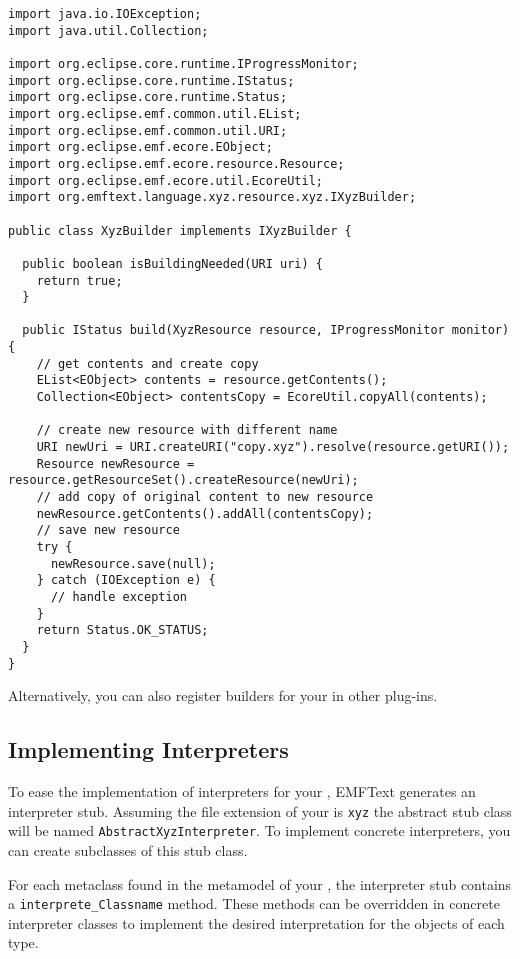 \begin{lstlisting}
import java.io.IOException;
import java.util.Collection;

import org.eclipse.core.runtime.IProgressMonitor;
import org.eclipse.core.runtime.IStatus;
import org.eclipse.core.runtime.Status;
import org.eclipse.emf.common.util.EList;
import org.eclipse.emf.common.util.URI;
import org.eclipse.emf.ecore.EObject;
import org.eclipse.emf.ecore.resource.Resource;
import org.eclipse.emf.ecore.util.EcoreUtil;
import org.emftext.language.xyz.resource.xyz.IXyzBuilder;

public class XyzBuilder implements IXyzBuilder {
  
  public boolean isBuildingNeeded(URI uri) {
    return true;
  }
  
  public IStatus build(XyzResource resource, IProgressMonitor monitor) {
    // get contents and create copy 
    EList<EObject> contents = resource.getContents();
    Collection<EObject> contentsCopy = EcoreUtil.copyAll(contents);
    
    // create new resource with different name
    URI newUri = URI.createURI("copy.xyz").resolve(resource.getURI());
    Resource newResource = resource.getResourceSet().createResource(newUri);
    // add copy of original content to new resource
    newResource.getContents().addAll(contentsCopy);
    // save new resource
    try {
      newResource.save(null);
    } catch (IOException e) {
      // handle exception
    }
    return Status.OK_STATUS;
  }
}
\end{lstlisting}

Alternatively, you can also register builders for your \DSL in other plug-ins.

\subsection{Implementing Interpreters}
\label{sec:cust_interpreters}

To ease the implementation of interpreters for your \DSL, EMFText generates an
interpreter stub. Assuming the file extension of your \DSL is \texttt{xyz} the
abstract stub class will be named \texttt{AbstractXyzInterpreter}. To implement
concrete interpreters, you can create subclasses of this stub class.

For each metaclass found in the metamodel of your \DSL, the interpreter
stub contains a \texttt{interprete\_Classname} method. These methods can be
overridden in concrete interpreter classes to implement the desired interpretation for the
objects of each type.

